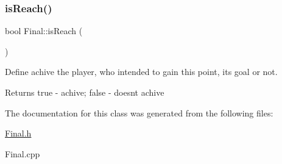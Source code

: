 \subsubsection{\texorpdfstring{is\+Reach()}{isReach()}}
{\footnotesize\ttfamily bool Final\+::is\+Reach (\begin{DoxyParamCaption}{ }\end{DoxyParamCaption})}



Define achive the player, who intended to gain this point, its goal or not. 

\begin{DoxyReturn}{Returns}
\textquotesingle{}true\textquotesingle{} -\/ achive; \textquotesingle{}false\textquotesingle{} -\/ doesn\textquotesingle{}t achive 
\end{DoxyReturn}


The documentation for this class was generated from the following files\+:\begin{DoxyCompactItemize}
\item 
\hyperlink{_final_8h}{Final.\+h}\item 
Final.\+cpp\end{DoxyCompactItemize}
